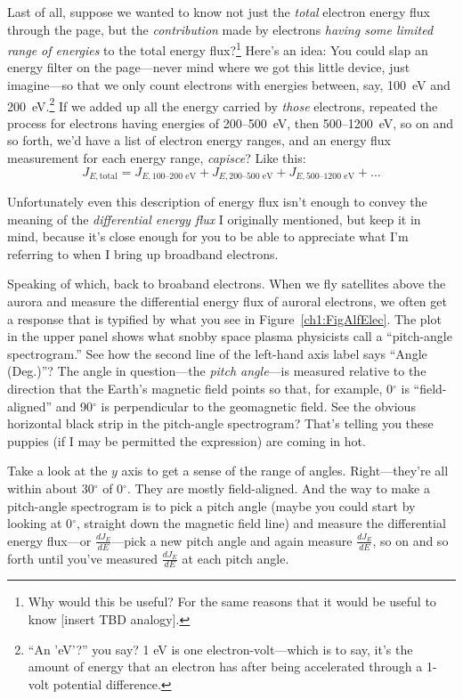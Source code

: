 Last of all, suppose we wanted to know not just the \emph{total}
electron energy flux through the page, but the \emph{contribution}
made by electrons \emph{having some limited range of energies} to the
total energy flux?\footnote{Why would this be useful?  For the same
  reasons that it would be useful to know [insert TBD analogy].}
Here's an idea: You could slap an energy filter on the page---never
mind where we got this little device, just imagine---so that we only
count electrons with energies between, say, 100~eV and
200~eV.\footnote{``An 'eV'?''  you say? 1 eV is one
  electron-volt---which is to say, it's the amount of energy that an
  electron has after being accelerated through a 1-volt potential
  difference.} If we added up all the energy carried by \emph{those}
electrons, repeated the process for electrons having energies of
200--500~eV, then 500--1200~eV, so on and so forth, we'd have a list
of electron energy ranges, and an energy flux measurement for each
energy range, \emph{capisce}? Like this:
\begin{equation}
  \label{ch1:eqeFlux}
  J_{E,\textrm{total}} = J_{E,\textrm{100--200 eV}} + J_{E,\textrm{200--500 eV}} + J_{E,\textrm{500--1200 eV}} + \dots
\end{equation}

Unfortunately even this description of energy flux isn't enough to
convey the meaning of the \emph{differential energy flux} I originally
mentioned, but keep it in mind, because it's close enough for you to
be able to appreciate what I'm referring to when I bring up broadband
electrons.

Speaking of which, back to broaband electrons. When we fly satellites
above the aurora and measure the differential energy flux of auroral
electrons, we often get a response that is typified by what you see in
Figure~\ref{ch1:FigAlfElec}. The plot in the upper panel shows what
snobby space plasma physicists call a ``pitch-angle spectrogram.''
See how the second line of the left-hand axis label says ``Angle
(Deg.)''?  The angle in question---the \emph{pitch angle}---is
measured relative to the direction that the Earth's magnetic field
points so that, for example, 0$^\circ$ is ``field-aligned'' and
90$^\circ$ is perpendicular to the geomagnetic field. See the obvious
horizontal black strip in the pitch-angle spectrogram? That's telling
you these puppies (if I may be permitted the expression) are coming in
hot.

Take a look at the $y$ axis to get a sense of the range of
angles. Right---they're all within about 30$^\circ$ of 0$^\circ$. They
are mostly field-aligned. And the way to make a pitch-angle
spectrogram is to pick a pitch angle (maybe you could start by looking
at 0$^\circ$, straight down the magnetic field line) and measure the
differential energy flux---or $\frac{d J_E}{dE}$---pick a new pitch
angle and again measure $\frac{d J_E}{dE}$, so on and so forth until
you've measured $\frac{d J_E}{dE}$ at each pitch angle.

